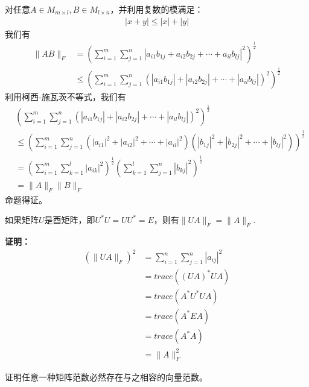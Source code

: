 \documentclass{article}
\begin{document}
对任意$A \in M_{m \times l}, B \in M_{l \times n}$，并利用复数的模满足：
\begin{align*}
  |x + y| \leq |x| + |y|
\end{align*}
我们有
\begin{align*}
  \|A B\|_F
   & = \left(\sum \limits_{i = 1}^m \sum \limits_{j = 1}^n |a_{i1}b_{1j} + a_{i2}b_{2j} + \cdots + a_{il}b_{lj}|^2 \right)^{\frac{1}{2}}          \\
   & \leq \left(\sum \limits_{i = 1}^m \sum \limits_{j = 1}^n (|a_{i1}b_{1j}| + |a_{i2}b_{2j}| + \cdots + |a_{il}b_{lj}|)^2 \right)^{\frac{1}{2}}
\end{align*}
利用柯西-施瓦茨不等式，我们有
\begin{align*}
   & \left(\sum \limits_{i = 1}^m \sum \limits_{j = 1}^n (|a_{i1}b_{1j}| + |a_{i2}b_{2j}| + \cdots + |a_{il}b_{lj}|)^2 \right)^{\frac{1}{2}}                                       \\
   & \leq \left(\sum \limits_{i = 1}^m \sum \limits_{j = 1}^n (|a_{i1}|^2 + |a_{i2}|^2 + \cdots + |a_{il}|^2)(|b_{1j}|^2 + |b_{2j}|^2 + \cdots + |b_{lj}|^2) \right)^{\frac{1}{2}} \\
   & = \left(\sum \limits_{i = 1}^m \sum \limits_{k = 1}^l |a_{ik}|^2\right)^{\frac{1}{2}} \left(\sum \limits_{k = 1}^l \sum \limits_{j = 1}^n |b_{kj}|^2\right)^{\frac{1}{2}}     \\
   & = \|A\|_F \|B\|_F
\end{align*}
命题得证。

\begin{zremark}
  如果矩阵$U$是酉矩阵，即$U^{*} U = U U^{*} = E$，则有$\|UA\|_F = \|A\|_F$.
\end{zremark}
\textbf{证明：}
\begin{align*}
  (\|UA\|_F)^2
   & = \sum\limits_{i = 1}^n \sum\limits_{j = 1}^n |a_{ij}|^2 \\
   & = trace((UA)^{*} UA)                                     \\
   & = trace(A^* U^* UA)                                      \\
   & = trace(A^* E A)                                         \\
   & = trace(A^* A)                                           \\
   & = \|A\|_F^2
\end{align*}

\begin{zremark}
  证明任意一种矩阵范数必然存在与之相容的向量范数。
\end{zremark}
\end{document}
